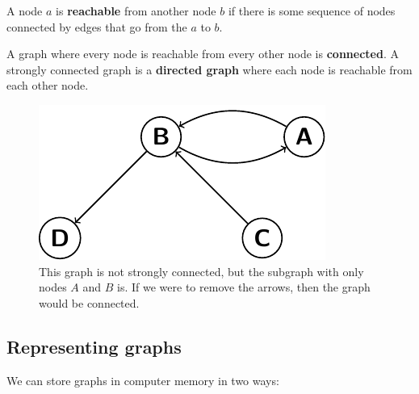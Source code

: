 A node $a$ is \textbf{reachable} from another node $b$ if there is some sequence
of nodes connected by edges that go from the $a$ to $b$.

A graph where every node is reachable from every other node is
\textbf{connected}. A strongly connected graph is a \textbf{directed graph}
where each node is reachable from each other node.

\begin{figure}[h]
  \centering
  \includegraphics{diagrams/connected-graph}
  \caption{This graph is not strongly connected, but the subgraph with only
  nodes $A$ and $B$ is. If we were to remove the arrows, then the graph would
  be connected.}
  \label{fig:connected-graph}
\end{figure}

\subsection{Representing graphs}

We can store graphs in computer memory in two ways:

